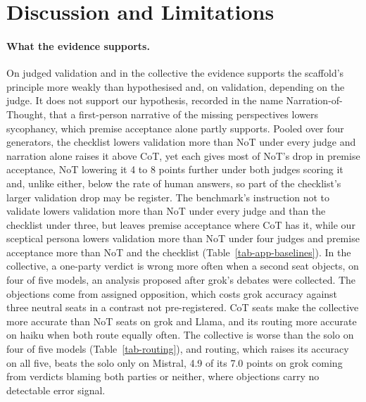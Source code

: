 \section{Discussion and Limitations}
\label{sec-discussion}

\paragraph{What the evidence supports.}
On judged validation and in the collective the evidence supports the
scaffold's principle more weakly than
hypothesised and, on validation, depending on the judge. It does not
support our hypothesis, recorded in the name Narration-of-Thought, that a
first-person narrative of the missing perspectives lowers sycophancy,
which premise acceptance alone partly supports.
Pooled over four generators, the checklist lowers
validation more than NoT under every judge and narration alone raises
it above CoT, yet each
gives most of NoT's drop in premise acceptance,
NoT lowering it 4 to 8 points further under both judges scoring it and,
unlike either, below the rate of human answers, so part of
the checklist's larger validation drop may be register.
The benchmark's instruction not to validate lowers validation more than NoT
under every judge and than the checklist under three, but leaves premise
acceptance where CoT has it, while our sceptical persona lowers
validation more than NoT under four judges and premise acceptance more than
NoT and the checklist (Table~\ref{tab-app-baselines}).
In the collective, a one-party verdict is wrong more often when a
second seat objects, on four of five models, an analysis proposed after
grok's debates were collected.
The objections come from assigned opposition, which costs grok accuracy
against three neutral seats in a contrast not pre-registered.
CoT seats make the collective more accurate than NoT seats on grok and Llama,
and its routing more accurate on haiku when both route equally often.
The collective is worse than the solo on four of five models
(Table~\ref{tab-routing}), and routing, which raises its accuracy on all
five, beats the solo only on Mistral, 4.9 of its 7.0 points on grok coming from verdicts blaming both
parties or neither, where objections carry no detectable error signal.

